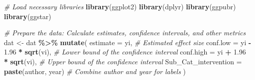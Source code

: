 \documentclass[
]{book}
\newenvironment{Shaded}{\begin{snugshade}}{\end{snugshade}}
\newcommand{\AttributeTok}[1]{\textcolor[rgb]{0.13,0.29,0.53}{#1}}
\newcommand{\CommentTok}[1]{\textcolor[rgb]{0.56,0.35,0.01}{\textit{#1}}}
\newcommand{\FloatTok}[1]{\textcolor[rgb]{0.00,0.00,0.81}{#1}}
\newcommand{\FunctionTok}[1]{\textcolor[rgb]{0.13,0.29,0.53}{\textbf{#1}}}
\newcommand{\NormalTok}[1]{#1}
\newcommand{\OtherTok}[1]{\textcolor[rgb]{0.56,0.35,0.01}{#1}}
\newcommand{\SpecialCharTok}[1]{\textcolor[rgb]{0.81,0.36,0.00}{\textbf{#1}}}
\begin{document}
\begin{Shaded}
\begin{Highlighting}[]
\CommentTok{\# Load necessary libraries}
\FunctionTok{library}\NormalTok{(ggplot2)}
\FunctionTok{library}\NormalTok{(dplyr)}
\FunctionTok{library}\NormalTok{(ggpubr)}
\FunctionTok{library}\NormalTok{(ggstar)}

\CommentTok{\# Prepare the data: Calculate estimates, confidence intervals, and other metrics}
\NormalTok{dat }\OtherTok{\textless{}{-}}\NormalTok{ dat }\SpecialCharTok{\%\textgreater{}\%}
  \FunctionTok{mutate}\NormalTok{(}
    \AttributeTok{estimate =}\NormalTok{ yi,  }\CommentTok{\# Estimated effect size}
    \AttributeTok{conf.low =}\NormalTok{ yi }\SpecialCharTok{{-}} \FloatTok{1.96} \SpecialCharTok{*} \FunctionTok{sqrt}\NormalTok{(vi),  }\CommentTok{\# Lower bound of the confidence interval}
    \AttributeTok{conf.high =}\NormalTok{ yi }\SpecialCharTok{+} \FloatTok{1.96} \SpecialCharTok{*} \FunctionTok{sqrt}\NormalTok{(vi),  }\CommentTok{\# Upper bound of the confidence interval}
    \AttributeTok{Sub\_Cat\_intervention =} \FunctionTok{paste}\NormalTok{(author, year)  }\CommentTok{\# Combine author and year for labels}
\NormalTok{  )}


\end{Highlighting}
\end{Shaded}
\end{document}
